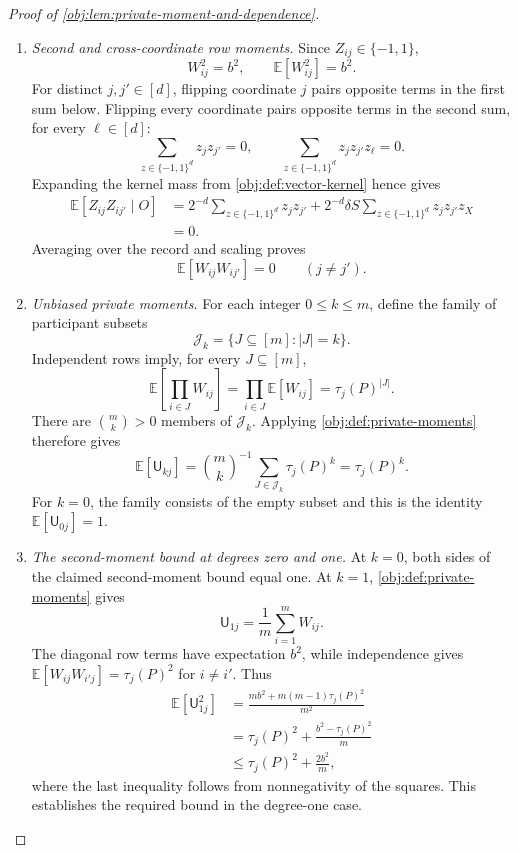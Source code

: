 \begin{proof}[Proof of \cref{obj:lem:private-moment-and-dependence}]
\begin{enumerate}
\item \textit{Second and cross-coordinate row moments.}
Since \(Z_{ij}\in\{-1,1\}\),
\[
W_{ij}^2=b^2,
\qquad
\mathbb E[W_{ij}^2]=b^2.
\]
For distinct \(j,j'\in[d]\), flipping coordinate \(j\) pairs opposite terms in the first sum below. Flipping every coordinate pairs opposite terms in the second sum, for every \(\ell\in[d]\):
\[
\sum_{z\in\{-1,1\}^d}z_jz_{j'}=0,
\qquad
\sum_{z\in\{-1,1\}^d}z_jz_{j'}z_\ell=0.
\]
Expanding the kernel mass from \cref{obj:def:vector-kernel} hence gives
\[
\begin{aligned}
\mathbb E[Z_{ij}Z_{ij'}\mid O]
&=
2^{-d}\sum_{z\in\{-1,1\}^d}z_jz_{j'}
+
2^{-d}\delta S
\sum_{z\in\{-1,1\}^d}z_jz_{j'}z_X\\
&=0.
\end{aligned}
\]
Averaging over the record and scaling proves
\[
\mathbb E[W_{ij}W_{ij'}]=0
\qquad(j\ne j').
\]

\item \textit{Unbiased private moments.}
For each integer \(0\le k\le m\), define the family of participant subsets
\[
\mathcal J_k=\{J\subseteq[m]:|J|=k\}.
\]
Independent rows imply, for every \(J\subseteq[m]\),
\[
\mathbb E\left[\prod_{i\in J}W_{ij}\right]
=
\prod_{i\in J}\mathbb E[W_{ij}]
=
\tau_j(P)^{|J|}.
\]
There are \(\binom mk>0\) members of \(\mathcal J_k\). Applying
\cref{obj:def:private-moments} therefore gives
\[
\mathbb E[\mathsf U_{kj}]
=
\binom mk^{-1}\sum_{J\in\mathcal J_k}\tau_j(P)^k
=
\tau_j(P)^k.
\]
For \(k=0\), the family consists of the empty subset and this is the identity
\(\mathbb E[\mathsf U_{0j}]=1\).

\item \textit{The second-moment bound at degrees zero and one.}
At \(k=0\), both sides of the claimed second-moment bound equal one.
At \(k=1\), \cref{obj:def:private-moments} gives
\[
\mathsf U_{1j}=\frac1m\sum_{i=1}^mW_{ij}.
\]
The diagonal row terms have expectation \(b^2\), while independence gives
\(\mathbb E[W_{ij}W_{i'j}]=\tau_j(P)^2\) for \(i\ne i'\).
Thus
\[
\begin{aligned}
\mathbb E[\mathsf U_{1j}^2]
&=
\frac{mb^2+m(m-1)\tau_j(P)^2}{m^2}\\
&=
\tau_j(P)^2+\frac{b^2-\tau_j(P)^2}{m}\\
&\le
\tau_j(P)^2+\frac{2b^2}{m},
\end{aligned}
\]
where the last inequality follows from nonnegativity of the squares.
This establishes the required bound in the degree-one case.


\end{enumerate}
\end{proof}
